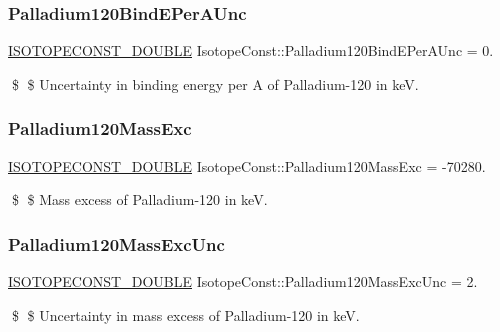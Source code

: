 \subsubsection{\texorpdfstring{Palladium120\+Bind\+E\+Per\+A\+Unc}{Palladium120BindEPerAUnc}}
{\footnotesize\ttfamily \mbox{\hyperlink{group___isotope_const-_macros_ga8f45a7272ce02c0b4c65c44636ed719a}{I\+S\+O\+T\+O\+P\+E\+C\+O\+N\+S\+T\+\_\+\+D\+O\+U\+B\+LE}} Isotope\+Const\+::\+Palladium120\+Bind\+E\+Per\+A\+Unc = 0.}

\$ \$ Uncertainty in binding energy per A of Palladium-\/120 in keV. \mbox{\label{group___isotope_const-_palladium-_pd120_ga575d76a5d455ef5499bae03e2aab3baf}} 
\subsubsection{\texorpdfstring{Palladium120\+Mass\+Exc}{Palladium120MassExc}}
{\footnotesize\ttfamily \mbox{\hyperlink{group___isotope_const-_macros_ga8f45a7272ce02c0b4c65c44636ed719a}{I\+S\+O\+T\+O\+P\+E\+C\+O\+N\+S\+T\+\_\+\+D\+O\+U\+B\+LE}} Isotope\+Const\+::\+Palladium120\+Mass\+Exc = -\/70280.}

\$ \$ Mass excess of Palladium-\/120 in keV. \mbox{\label{group___isotope_const-_palladium-_pd120_gaa8cc16390ada3668e7660f68845ee6c4}} 
\subsubsection{\texorpdfstring{Palladium120\+Mass\+Exc\+Unc}{Palladium120MassExcUnc}}
{\footnotesize\ttfamily \mbox{\hyperlink{group___isotope_const-_macros_ga8f45a7272ce02c0b4c65c44636ed719a}{I\+S\+O\+T\+O\+P\+E\+C\+O\+N\+S\+T\+\_\+\+D\+O\+U\+B\+LE}} Isotope\+Const\+::\+Palladium120\+Mass\+Exc\+Unc = 2.}

\$ \$ Uncertainty in mass excess of Palladium-\/120 in keV. \mbox{\label{group___isotope_const-_palladium-_pd120_gae4cc973af23c55c5fb205e5d7194495c}} 
